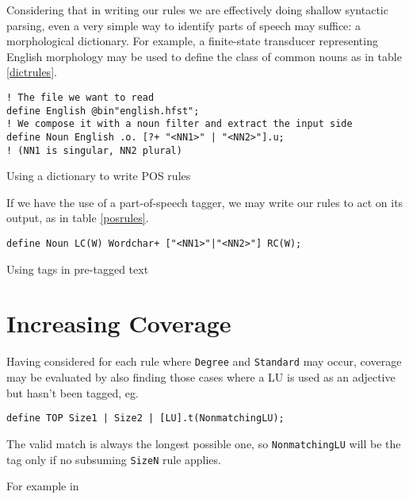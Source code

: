 \documentclass{llncs}
\begin{document}
Considering that in writing our
rules we are effectively doing shallow syntactic parsing, even a very simple
way to identify parts of speech may suffice: a morphological dictionary.
For example, a finite-state transducer representing English morphology may be
used to define the class of common nouns as in table \ref{dictrules}.

\begin{table}[h]
\small
  \begin{framed}
\begin{verbatim}
! The file we want to read
define English @bin"english.hfst";
! We compose it with a noun filter and extract the input side
define Noun English .o. [?+ "<NN1>" | "<NN2>"].u;
! (NN1 is singular, NN2 plural)
\end{verbatim}
\end{framed}
  \normalsize
  \caption{Using a dictionary to write POS rules}
  \label{dictrules}
  \end{table}

If we have the use of a part-of-speech tagger, we may write our rules to act
on its output, as in table \ref{posrules}.

\begin{table}[h]
  \small
  \begin{framed}
\begin{verbatim}
define Noun LC(W) Wordchar+ ["<NN1>"|"<NN2>"] RC(W);
\end{verbatim}
\end{framed}
  \normalsize
  \caption{Using tags in pre-tagged text}
  \label{posrules}
  \end{table}

\section{Increasing Coverage}
Having considered for each rule where \verb+Degree+ and \verb+Standard+ may occur, coverage may be evaluated by also finding those cases where a LU is used as an adjective but hasn't been tagged, eg.

\small
\begin{verbatim}
define TOP Size1 | Size2 | [LU].t(NonmatchingLU);
\end{verbatim}
\normalsize

The valid match is always the longest possible one, so \verb+NonmatchingLU+ will be the tag only if no subsuming \verb+SizeN+ rule applies.

For example in
\end{document}
